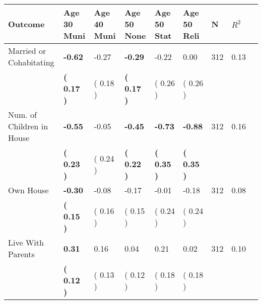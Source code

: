 \begin{tabular}{L{6.2cm} C{1.8cm} C{1.8cm} C{1.8cm} C{1.8cm} C{1.8cm} C{1.8cm} C{0.3cm} C{0.3cm}}
\toprule
 \textbf{Outcome} & \textbf{Age 30 Muni} & \textbf{Age 40 Muni} & \textbf{Age 50 None} & \textbf{Age 50 Stat} & \textbf{Age 50 Reli} & \textbf{N} & \textbf{$ R^2$} \\
\midrule
Married or Cohabitating & \textbf{    -0.62} &     -0.27 & \textbf{    -0.29} &     -0.22 &      0.00  & 312 &       0.13 \\ 
 & \textbf{(     0.17 )} & (     0.18 ) & \textbf{(     0.17 )} & (     0.26 ) & (     0.26 )  & \\
Num. of Children in House & \textbf{    -0.55} &     -0.05 & \textbf{    -0.45} & \textbf{    -0.73} & \textbf{    -0.88}  & 312 &       0.16 \\ 
 & \textbf{(     0.23 )} & (     0.24 ) & \textbf{(     0.22 )} & \textbf{(     0.35 )} & \textbf{(     0.35 )}  & \\
Own House & \textbf{    -0.30} &     -0.08 &     -0.17 &     -0.01 &     -0.18  & 312 &       0.08 \\ 
 & \textbf{(     0.15 )} & (     0.16 ) & (     0.15 ) & (     0.24 ) & (     0.24 )  & \\
Live With Parents & \textbf{     0.31} &      0.16 &      0.04 &      0.21 &      0.02  & 312 &       0.10 \\ 
 & \textbf{(     0.12 )} & (     0.13 ) & (     0.12 ) & (     0.18 ) & (     0.18 )  & \\
\bottomrule
\end{tabular}
